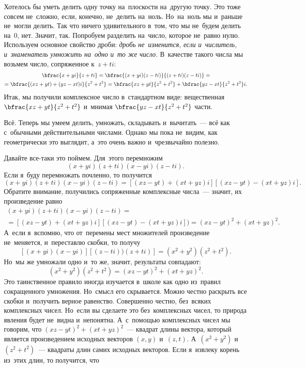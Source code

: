 Хотелось бы уметь делить одну точку на~плоскости на~другую точку. Это тоже совсем не~сложно, если,
конечно, не~делить на~ноль. Но~на~ноль мы и~раньше не~могли делить. Так что ничего удивительного
в~том, что мы не~будем делить на~0, нет. Значит, так. Попробуем разделить на~число, которое
не~равно нулю. Используем основное свойство дроби: \textit{дробь не~изменится, если и~числитель,
и~знаменатель умножить на~одно и~то же число.} В~качестве такого числа мы возьмем число, сопряженное
к~$z+ti$:
\begin{multline*}
\bfrac{x+yi}{z+ti}=
\bfrac{(x+yi)(z-ti)}{(z+ti)(z-ti)}=
\\=
\bfrac{(xz+yt)+(yz-xt)i}{z^{2}+t^{2}}=
\bfrac{xz+yt}{z^{2}+t^{2}}+\bfrac{yz-xt}{z^{2}+t^{2}}i.
\end{multline*}
Итак, мы получили комплексное число в~стандартном виде: вещественная $\bfrac{xz+yt}{z^{2}+t^{2}}$
и~мнимая $\bfrac{yz-xt}{z^{2}+t^{2}}$ части.

Всё. Теперь мы умеем делить, умножать, складывать и~вычитать~--- всё как с~обычными действительными
числами. Однако мы пока не~видим, как геометрически это выглядит, а~это очень важно и~чрезвычайно
полезно.

Давайте все-таки это поймем. Для~этого перемножим $$(x+yi)(z+ti)(x-yi)(z-ti).$$
Если я~буду перемножать почленно, то получится
$$
(x+yi)(z+ti)(x-yi)(z-ti) = [(xz-yt)+(xt+yz)i][(xz-yt)-(xt+yz)i].
$$
Обратите внимание, получились сопряженные комплексные числа~--- значит, их произведение равно
\begin{multline*}
(x+yi)(z+ti)(x-yi)(z-ti) =
\\=
[(xz-yt)+(xt+yz)i][(xz-yt)-(xt+yz)i]) =
(xz-yt)^{2}+(xt+yz)^{2}.
\end{multline*}
А~если я~вспомню, что от~перемены мест множителей произведение не~меняется, и~переставлю скобки, то получу
$$
[(x+yi )(x-yi)][(z-ti) )(z+ti)]=
(x^{2}+y^{2})(z^{2}+t^{2}).
$$
Но~мы же умножали одно и~то же, значит, результаты совпадают:
$$
(x^{2}+y^{2})(z^{2}+t^{2})=
(xz-yt)^{2}+(xt+yz)^{2}.
$$
Это таинственное правило иногда изучается в~школе как одно из~правил сокращенного умножения.
Но~смысл его скрывается. Можно честно раскрыть все скобки и~получить верное равенство. Совершенно
честно, без~всяких комплексных чисел. Но~если вы сделаете это без~комплексных чисел, то природа
явления будет не~видна и~непонятна.
 А~с~помощью комплексных чисел мы говорим, что $(xz-yt)^{2}+(xt+yz)^{2}$~---
квадрат длины вектора, который является произведением исходных
векторов $(x,y)$ и~$(z,t)$. А~$(x^{2}+y^{2})$ и~$(z^{2}+t^{2})$~--- квадраты длин самих исходных векторов. Если я~извлеку
корень из~этих длин, то получится, что

